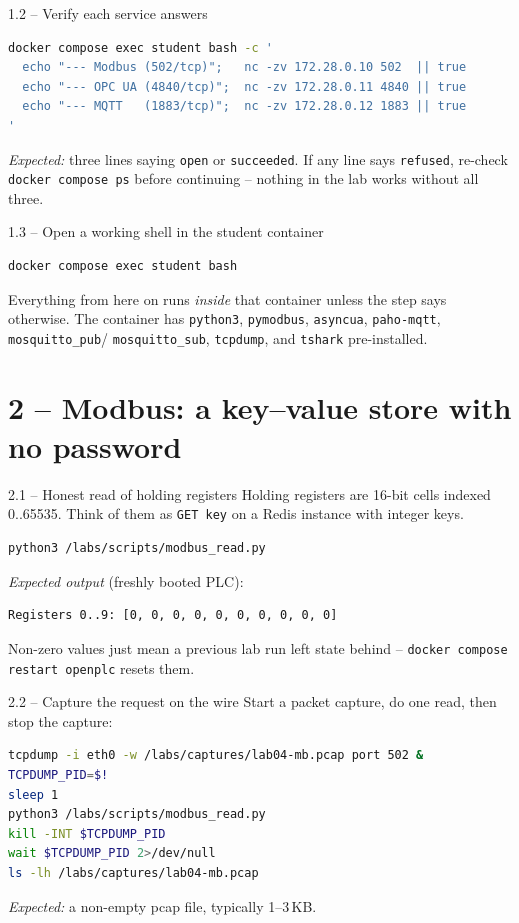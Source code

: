 \documentclass[11pt,a4paper]{article}
\begin{document}
\begin{stepbox}{1.2 -- Verify each service answers}
\begin{lstlisting}[language=bash]
docker compose exec student bash -c '
  echo "--- Modbus (502/tcp)";   nc -zv 172.28.0.10 502  || true
  echo "--- OPC UA (4840/tcp)";  nc -zv 172.28.0.11 4840 || true
  echo "--- MQTT   (1883/tcp)";  nc -zv 172.28.0.12 1883 || true
'
\end{lstlisting}
\emph{Expected:} three lines saying \texttt{open} or \texttt{succeeded}.
If any line says \texttt{refused}, re-check \texttt{docker compose ps}
before continuing -- nothing in the lab works without all three.
\end{stepbox}

\begin{stepbox}{1.3 -- Open a working shell in the student container}
\begin{lstlisting}[language=bash]
docker compose exec student bash
\end{lstlisting}
Everything from here on runs \emph{inside} that container unless the step
says otherwise. The container has \texttt{python3}, \texttt{pymodbus},
\texttt{asyncua}, \texttt{paho-mqtt}, \texttt{mosquitto\_pub}/
\texttt{mosquitto\_sub}, \texttt{tcpdump}, and \texttt{tshark} pre-installed.
\end{stepbox}

\section*{2 -- Modbus: a key--value store with no password}

\begin{stepbox}{2.1 -- Honest read of holding registers}
Holding registers are 16-bit cells indexed 0..65535. Think of them as
\texttt{GET key} on a Redis instance with integer keys.
\begin{lstlisting}[language=bash]
python3 /labs/scripts/modbus_read.py
\end{lstlisting}
\emph{Expected output} (freshly booted PLC):
\begin{lstlisting}
Registers 0..9: [0, 0, 0, 0, 0, 0, 0, 0, 0, 0]
\end{lstlisting}
Non-zero values just mean a previous lab run left state behind --
\texttt{docker compose restart openplc} resets them.
\end{stepbox}

\begin{stepbox}{2.2 -- Capture the request on the wire}
Start a packet capture, do one read, then stop the capture:
\begin{lstlisting}[language=bash]
tcpdump -i eth0 -w /labs/captures/lab04-mb.pcap port 502 &
TCPDUMP_PID=$!
sleep 1
python3 /labs/scripts/modbus_read.py
kill -INT $TCPDUMP_PID
wait $TCPDUMP_PID 2>/dev/null
ls -lh /labs/captures/lab04-mb.pcap
\end{lstlisting}
\emph{Expected:} a non-empty pcap file, typically 1--3\,KB.
\end{stepbox}
\end{document}
